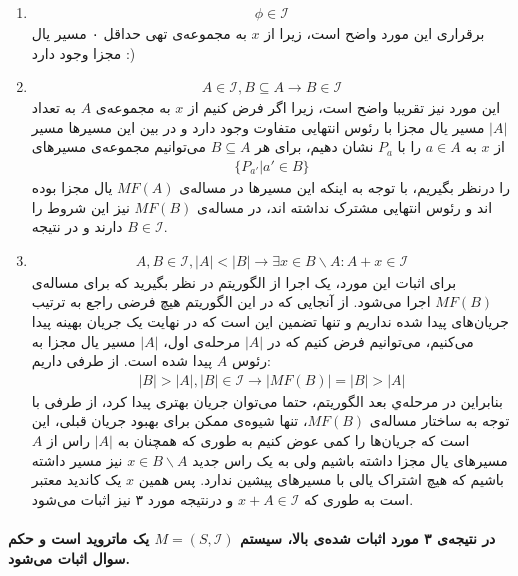 \documentclass[a4paper,12pt]{article}
\begin{document}
\begin{enumerate}
	\item \begin{align*} \phi \in \mathcal{I} \end{align*}
برقراری این مورد واضح است، زیرا از $x$ به مجموعه‌ی تهی حداقل ۰ مسیر یال مجزا وجود دارد :)

	\item \begin{align*}
		A \in \mathcal{I} , B \subseteq A \rightarrow B \in \mathcal{I}
	\end{align*}
	این	مورد نیز تقریبا واضح است، زیرا اگر فرض کنیم از $x$ به مجموعه‌ی $A$ به تعداد $|A|$ مسیر یال مجزا با رئوس انتهایی متفاوت وجود دارد و در بین این مسیر‌‌ها مسیر از $x$
به
$a \in A$
را با
$P_a$
نشان دهیم، برای هر
$B \subseteq A$
می‌توانیم 
مجموعه‌ی مسیر‌های
\begin{align*}
	\{P_{a'} | a' \in B \} 
\end{align*}
را درنظر بگیریم، با توجه به اینکه این مسیر‌ها در مساله‌ی $MF(A)$ یال مجزا بوده اند و رئوس انتهایی مشترک نداشته اند، در مساله‌ی $MF(B)$ نیز این شروط را دارند و در نتیجه
$B \in \mathcal{I}$.

	\item 
	\begin{align*}
		A,B \in \mathcal{I} , |A| < |B| \rightarrow \exists x \in B \backslash A : A + x \in \mathcal{I}
	\end{align*}
برای اثبات این مورد، یک اجرا از الگوریتم 
در نظر بگیرید که برای مساله‌ی $MF(B)$ اجرا می‌شود. از آنجایی که در این الگوریتم هیچ فرضی راجع به ترتیب جریان‌های پیدا شده نداریم و تنها تضمین این است که در نهایت یک جریان بهینه پیدا می‌کنیم، می‌توانیم فرض کنیم که در $|A|$ مرحله‌ی اول، $|A|$ مسیر یال مجزا به رئوس $A$ پیدا شده است. 
از طرفی داریم:
\begin{align*}
|B| > |A| , |B| \in \mathcal{I} \rightarrow |MF(B)| = |B| > |A|	
\end{align*}
بنابراین در مرحله‌ي بعد الگوریتم، حتما می‌توان جریان‌ بهتری پیدا کرد، از طرفی با توجه به ساختار مساله‌ی $MF(B)$، تنها شیوه‌ی ممکن برای بهبود جریان‌ قبلی، این است که جریان‌ها را کمی عوض کنیم به طوری که همچنان به $|A|$ راس از $A$ مسیر‌های یال مجزا داشته باشیم ولی به یک راس جدید $x \in B \backslash A$ نیز مسیر داشته باشیم که هیچ اشتراک یالی با مسیر‌های پیشین ندارد. پس همین $x$ یک کاندید معتبر است به طوری که
$x + A \in \mathcal{I}$
و درنتیجه مورد ۳ نیز اثبات می‌شود.
\end{enumerate}
\paragraph{در نتیجه‌ی ۳ مورد اثبات شده‌ی بالا، سیستم $M = (S,\mathcal{I})$ یک ماتروید است و حکم سوال اثبات می‌شود.}
\end{document}
